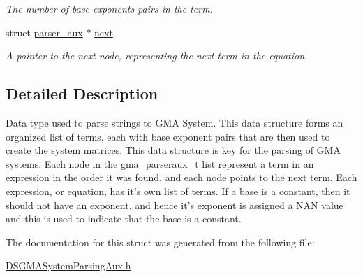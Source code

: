 \begin{DoxyCompactItemize}
\begin{DoxyCompactList}\small\item\em The number of base-\/exponents pairs in the term. \item\end{DoxyCompactList}\item 
\hypertarget{structparser__aux_aa1021e1ebd964427cfc06e1400180a26}{
struct \hyperlink{structparser__aux}{parser\_\-aux} $\ast$ \hyperlink{structparser__aux_aa1021e1ebd964427cfc06e1400180a26}{next}}
\label{structparser__aux_aa1021e1ebd964427cfc06e1400180a26}

\begin{DoxyCompactList}\small\item\em A pointer to the next node, representing the next term in the equation. \item\end{DoxyCompactList}\end{DoxyCompactItemize}


\subsection{Detailed Description}
Data type used to parse strings to GMA System. This data structure forms an organized list of terms, each with base exponent pairs that are then used to create the system matrices. This data structure is key for the parsing of GMA systems. Each node in the gma\_\-parseraux\_\-t list represent a term in an expression in the order it was found, and each node points to the next term. Each expression, or equation, has it's own list of terms. If a base is a constant, then it should not have an exponent, and hence it's exponent is assigned a NAN value and this is used to indicate that the base is a constant. 

The documentation for this struct was generated from the following file:\begin{DoxyCompactItemize}
\item 
\hyperlink{_d_s_g_m_a_system_parsing_aux_8h}{DSGMASystemParsingAux.h}\end{DoxyCompactItemize}
